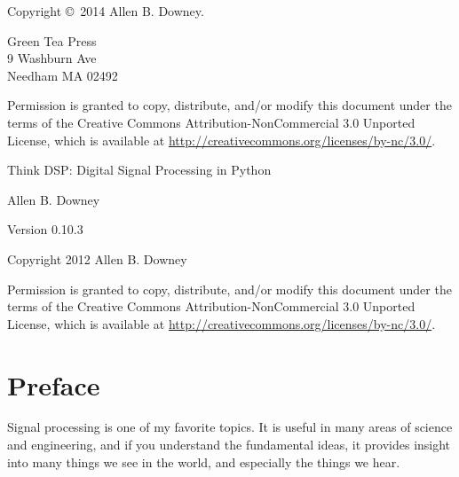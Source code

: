 \documentclass[12pt]{book}
\newcommand{\thetitle}{Think DSP: Digital Signal Processing in Python}
\newcommand{\theversion}{0.10.3}
\begin{document}
\begin{latexonly}
Copyright \copyright ~2014 Allen B. Downey.


\vspace{0.2in}

\begin{flushleft}
Green Tea Press       \\
9 Washburn Ave \\
Needham MA 02492
\end{flushleft}

Permission is granted to copy, distribute, and/or modify this document
under the terms of the Creative Commons Attribution-NonCommercial 3.0 Unported
License, which is available at \url{http://creativecommons.org/licenses/by-nc/3.0/}.

\vspace{0.2in}

\end{latexonly}



\begin{htmlonly}


{\Large \thetitle}

{\large Allen B. Downey}

Version \theversion

\vspace{0.25in}

Copyright 2012 Allen B. Downey

\vspace{0.25in}

Permission is granted to copy, distribute, and/or modify this document
under the terms of the Creative Commons Attribution-NonCommercial 3.0
Unported License, which is available at
\url{http://creativecommons.org/licenses/by-nc/3.0/}.

\setcounter{chapter}{-1}

\end{htmlonly}

\fi

\chapter{Preface}
\label{preface}

Signal processing is one of my favorite topics.  It is useful
in many areas of science and engineering, and if you understand
the fundamental ideas, it provides insight into many things
we see in the world, and especially the things we hear.
\end{document}
